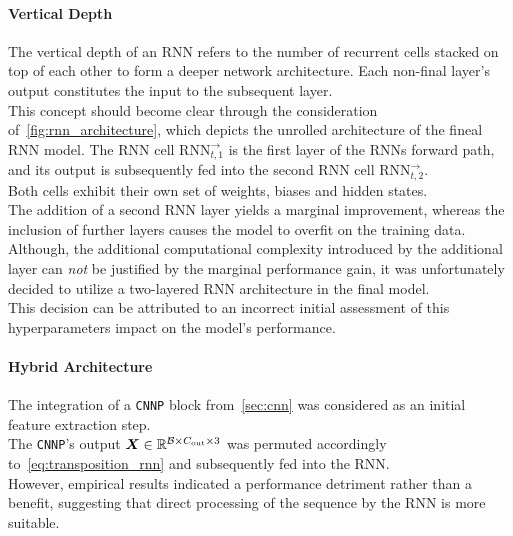 \paragraph{Vertical Depth}
The vertical depth of an RNN refers to the number of recurrent cells stacked on top of each other to form a
deeper network architecture. Each non-final layer's output constitutes the input to the subsequent layer.\\
This concept should become clear through the consideration of~\autoref{fig:rnn_architecture}, which depicts the unrolled
architecture of the fineal RNN model. The RNN cell \( \mathrm{RNN}^{\rightarrow}_{t, 1} \) is the first layer of the RNNs
forward path, and its output is subsequently fed into the second RNN cell \( \mathrm{RNN}^{\rightarrow}_{t, 2} \). \\
Both cells exhibit their own set of weights, biases and hidden states.\\
The addition of a second RNN layer yields a marginal improvement, whereas the inclusion of further
layers causes the model to overfit on the training data. Although, the additional computational complexity introduced by
the additional layer can \emph{not} be justified by the marginal performance gain, it was unfortunately decided to utilize a
two-layered RNN architecture in the final model. \\
This decision can be attributed to an incorrect initial assessment of this hyperparameters impact on the model's performance.\\


\paragraph{Hybrid Architecture} The integration of a \texttt{CNNP} block from~\autoref{sec:cnn} was considered as an
initial feature extraction step. \\
The \texttt{CNNP}'s output \( \boldsymbol{X} \in \mathbb{R}^{\mathcal{B} \times C_{\text{out}} \times 3} \) was permuted accordingly to~\autoref{eq:transposition_rnn}
and subsequently fed into the RNN. \\
However, empirical results indicated a performance detriment rather than a benefit, suggesting that direct processing of
the sequence by the RNN is more suitable.

